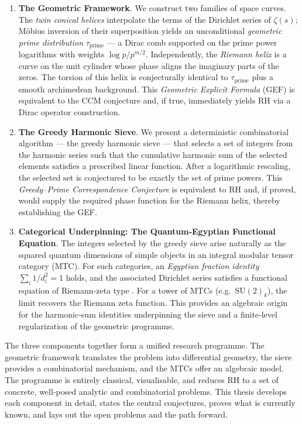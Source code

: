 \documentclass[12pt,a4paper,twoside]{book}
\begin{document}
\begin{enumerate}
\item \textbf{The Geometric Framework}.  We construct two families of space curves.  The \emph{twin conical helices} interpolate the terms of the Dirichlet series of \(\zeta(s)\); Möbius inversion of their superposition yields an unconditional \emph{geometric prime distribution} \(\tau_{\text{prime}}\) — a Dirac comb supported on the prime power logarithms with weights \(\log p/p^{m/2}\).  Independently, the \emph{Riemann helix} is a curve on the unit cylinder whose phase aligns the imaginary parts of the zeros.  The torsion of this helix is conjecturally identical to \(\tau_{\text{prime}}\) plus a smooth archimedean background.  This \emph{Geometric Explicit Formula} (GEF) is equivalent to the CCM conjecture and, if true, immediately yields RH via a Dirac operator construction.

\item \textbf{The Greedy Harmonic Sieve}.  We present a deterministic combinatorial algorithm — the greedy harmonic sieve — that selects a set of integers from the harmonic series such that the cumulative harmonic sum of the selected elements satisfies a prescribed linear function.  After a logarithmic rescaling, the selected set is conjectured to be exactly the set of prime powers.  This \emph{Greedy–Prime Correspondence Conjecture} is equivalent to RH and, if proved, would supply the required phase function for the Riemann helix, thereby establishing the GEF.

\item \textbf{Categorical Underpinning: The Quantum‑Egyptian Functional Equation}.  The integers selected by the greedy sieve arise naturally as the squared quantum dimensions of simple objects in an integral modular tensor category (MTC).  For such categories, an \emph{Egyptian fraction identity} \(\sum_i 1/d_i^2 = 1\) holds, and the associated Dirichlet series satisfies a functional equation of Riemann‑zeta type \cite{QEFE}.  For a tower of MTCs (e.g.\ \(\mathrm{SU}(2)_k\)), the limit recovers the Riemann zeta function.  This provides an algebraic origin for the harmonic‑sum identities underpinning the sieve and a finite‑level regularization of the geometric programme.
\end{enumerate}

The three components together form a unified research programme.  The geometric framework translates the problem into differential geometry, the sieve provides a combinatorial mechanism, and the MTCs offer an algebraic model.  The programme is entirely classical, visualisable, and reduces RH to a set of concrete, well‑posed analytic and combinatorial problems.  This thesis develops each component in detail, states the central conjectures, proves what is currently known, and lays out the open problems and the path forward.
\end{document}
